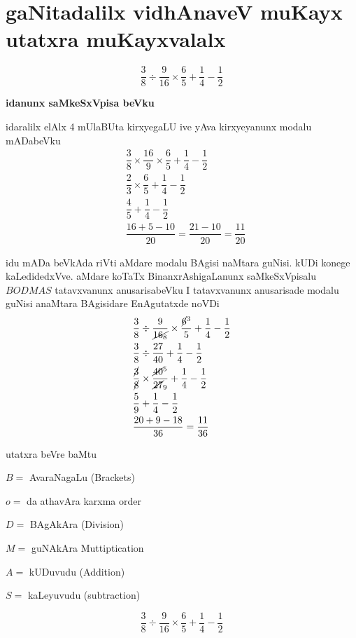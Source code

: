 \chapter{gaNitadalilx vidhAnaveV muKayx utatxra muKayxvalalx}

$$
\dfrac{3}{8}\div\dfrac{9}{16}\times\dfrac{6}{5}+\dfrac{1}{4}-\dfrac{1}{2}
$$

\textbf{idanunx saMkeSxVpisa beVku}

idaralilx elAlx {\rm 4} mUlaBUta kirxyegaLU ive yAva kirxyeyanunx modalu mADabeVku
\begin{align*}
& \dfrac{3}{8}\times\dfrac{16}{9}\times\dfrac{6}{5}+\dfrac{1}{4}-\dfrac{1}{2}\\
& \dfrac{2}{3}\times\dfrac{6}{5}+\dfrac{1}{4}-\dfrac{1}{2}\\
& \dfrac{4}{5}+\dfrac{1}{4}-\dfrac{1}{2}\\
& \dfrac{16+5-10}{20}=\dfrac{21-10}{20}=\dfrac{11}{20}
\end{align*}

idu mADa beVkAda riVti aMdare modalu BAgisi naMtara guNisi. kUDi konege kaLedidedxVve. aMdare koTaTx BinanxrAshigaLanunx saMkeSxVpisalu \quad $BODMAS$ \quad 
tatavxvanunx anusarisabeVku I tatavxvanunx anusarisade modalu guNisi anaMtara BAgisidare EnAgutatxde noVDi
\begin{align*}
& \dfrac{3}{8}\div \dfrac{9}{\cancel{16_8}}\times\dfrac{\cancel{6}^3}{5}+\dfrac{1}{4}-\dfrac{1}{2}\\
& \dfrac{3}{8}\div \dfrac{27}{40}+\dfrac{1}{4}-\dfrac{1}{2}\\
& \dfrac{\cancel{3}}{\cancel{8}}\times \dfrac{\cancel{40}^5}{\cancel{27}_9}+\dfrac{1}{4}-\dfrac{1}{2}\\
& \dfrac{5}{9}+\dfrac{1}{4}-\dfrac{1}{2}\\
& \dfrac{20+9-18}{36}=\dfrac{11}{36}
\end{align*}

utatxra beVre baMtu

$B=$ \quad AvaraNagaLu {\rm (Brackets)}

$o=$ \quad da athavAra karxma {\rm order}

$D=$ \quad BAgAkAra {\rm (Division)}

$M=$ \quad guNAkAra {\rm Muttiptication}

$A=$ \quad kUDuvudu {\rm (Addition)}

$S=$ \quad kaLeyuvudu {\rm (subtraction)}

$$
\dfrac{3}{8}\div\dfrac{9}{16}\times\dfrac{6}{5}+\dfrac{1}{4}-\dfrac{1}{2}
$$

